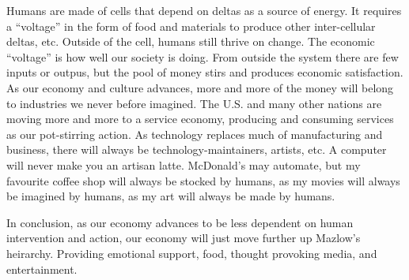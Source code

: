 \documentclass{amsart}
\begin{document}
  Humans are made of cells that depend on deltas as a source of energy. It requires a ``voltage'' in the form of food and materials to produce other inter-cellular deltas, etc. Outside of the cell, humans still thrive on change. The economic ``voltage'' is how well our society is doing. From outside the system there are few inputs or outpus, but the pool of money stirs and produces economic satisfaction. As our economy and culture advances, more and more of the money will belong to industries we never before imagined. The U.S. and many other nations are moving more and more to a service economy, producing and consuming services as our pot-stirring action. As technology replaces much of manufacturing and business, there will always be technology-maintainers, artists, etc. A computer will never make you an artisan latte. McDonald's may automate, but my favourite coffee shop will always be stocked by humans, as my movies will always be imagined by humans, as my art will always be made by humans.

  In conclusion, as our economy advances to be less dependent on human intervention and action, our economy will just move further up Mazlow's heirarchy. Providing emotional support, food, thought provoking media, and entertainment.
\end{document}
